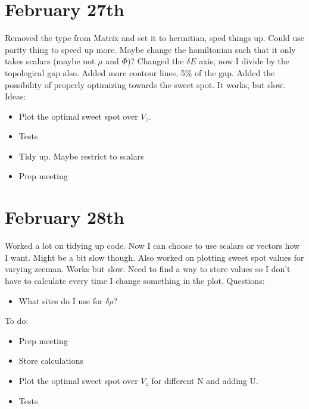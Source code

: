 \documentclass{article}
\begin{document}
\section*{February 27th}
Removed the type from Matrix and set it to hermitian, sped things up. Could use parity thing to speed up more. Maybe change the hamiltonian such that it only takes scalars (maybe not $\mu$ and $\Phi$)? Changed the $\delta E$ axis, now I divide by the topological gap also. Added more contour lines, 5\% of the gap. Added the possibility of properly optimizing towards the sweet spot. It works, but slow. Ideas: 
\begin{itemize}
    \item Plot the optimal sweet spot over $V_z$.
    \item Tests
    \item Tidy up. Maybe restrict to scalars
    \item Prep meeting
\end{itemize}
\section*{February 28th}
Worked a lot on tidying up code. Now I can choose to use scalars or vectors how I want. Might be a bit slow though. Also worked on plotting sweet spot values for varying zeeman. Works but slow. Need to find a way to store values so I don't have to calculate every time I change something in the plot. Questions:
\begin{itemize}
    \item What sites do I use for $\delta \rho$?
\end{itemize}
To do:
\begin{itemize}
    \item Prep meeting
    \item Store calculations
    \item Plot the optimal sweet spot over $V_z$ for different N and adding U.
    \item Tests
\end{itemize}
\end{document}
